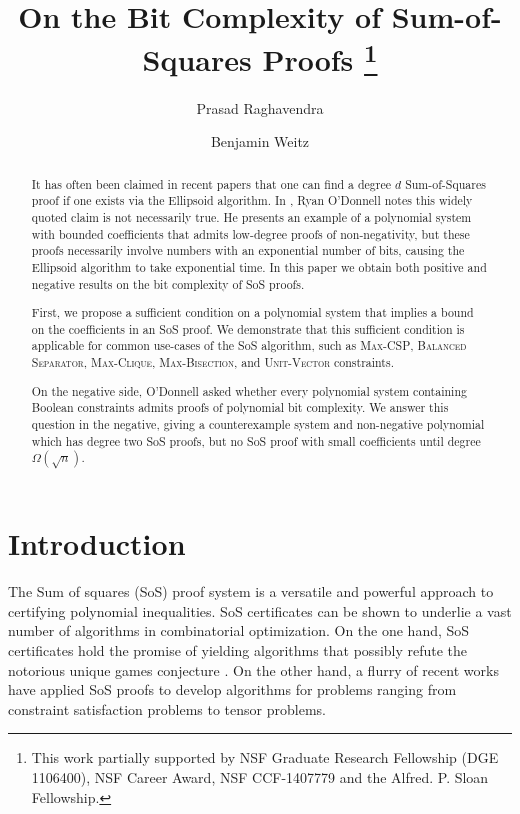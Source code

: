 \documentclass[a4paper,UKenglish]{lipics-v2016}
\title{On the Bit Complexity of Sum-of-Squares Proofs \footnote{This work partially supported by NSF Graduate Research Fellowship (DGE 1106400), NSF Career Award, NSF CCF-1407779 and the Alfred. P. Sloan Fellowship.}}
\author[1]{Prasad Raghavendra}
\author[2]{Benjamin Weitz}
\affil[1]{UC Berkeley, Berkeley CA, USA\\
  \texttt{raghavendra@berkeley.edu}
	 }
\affil[2]{UC Berkeley, Berkeley CA, USA\\
  \texttt{bsweitz@eecs.berkeley.edu}
}
\begin{document}
\maketitle

\begin{abstract}
	It has often been claimed in recent papers that one can find a degree $d$ Sum-of-Squares proof if one exists via the Ellipsoid algorithm. In \cite{odonnell17}, Ryan O'Donnell notes this widely quoted claim is not necessarily true. He presents an example of a polynomial system with bounded coefficients that admits low-degree proofs of non-negativity, but these proofs necessarily involve numbers with an exponential number of bits, causing the Ellipsoid algorithm to take exponential time. In this paper we obtain both positive and negative results on the bit complexity of SoS proofs. 

	First, we propose a sufficient condition on a polynomial system that implies a bound on the coefficients in an SoS proof.  We demonstrate that this sufficient condition is applicable for common use-cases of the SoS algorithm, such as \textsc{Max-CSP}, \textsc{Balanced Separator}, \textsc{Max-Clique}, \textsc{Max-Bisection}, and \textsc{Unit-Vector} constraints. 
	
	On the negative side, O'Donnell asked whether every polynomial system containing Boolean constraints admits proofs of polynomial bit complexity. We answer this question in the negative, giving a counterexample system and non-negative polynomial which has degree two SoS proofs, but no SoS proof with small coefficients until degree $\Omega(\sqrt{n})$.
 \end{abstract}

\section{Introduction}
\label{sec:intro}

The Sum of squares (SoS) proof system is a versatile and powerful approach to certifying polynomial inequalities. 
SoS certificates can be shown to underlie a vast number of algorithms in combinatorial optimization. 
On the one hand, SoS certificates hold the promise of yielding algorithms that possibly refute the notorious unique games conjecture \cite{BBHKSZ12, barak2011rounding,GuruswamiS11}.  
On the other hand, a flurry of recent works have applied SoS proofs to develop algorithms for problems ranging from constraint satisfaction problems to tensor problems.  
\end{document}
